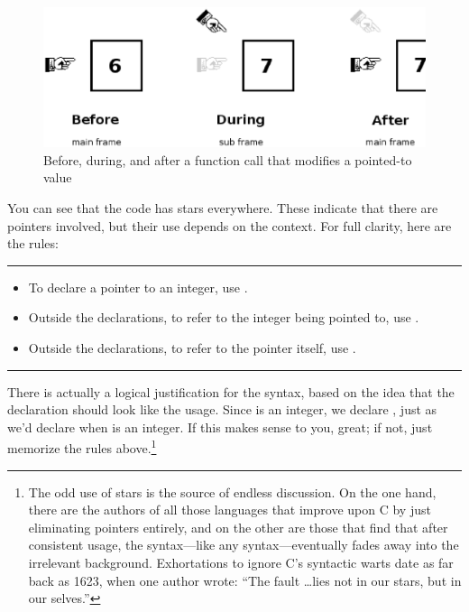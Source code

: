 \begin{figure}
\hskip -1cm
\includegraphics[width=\textwidth*\real{1.1}]{finger.ps}
\caption{Before, during, and after a function call that modifies a pointed-to value}
\label{fingerfig}
\end{figure}

\lstset{numbers=left, numberstyle=\scshape}
\lstset{numbers=none}

You can see that the code has stars everywhere. These
indicate that there are pointers involved, but their use depends on the
context.
For full clarity, here are the rules:
\vspace \baselineskip
\hrule
\vspace \baselineskip
\begin{itemize}
\item To declare a pointer to an integer, use .
\item Outside the declarations, to refer to the integer being pointed to, use .
\item Outside the declarations, to refer to the pointer itself, use
.
\end{itemize}
\vspace \baselineskip
\hrule
\vspace \baselineskip

There is actually a
logical justification for the syntax, based on the
idea that the declaration should look like
the usage. Since  is an integer, we declare ,
just as we'd declare  when  is an integer.
If this makes sense to you, great; if not, just memorize the rules 
above.\footnote{The
odd use of stars is the source of endless discussion. On the one hand,
there are the authors of all those languages that improve upon C by
just eliminating pointers entirely, and on the other are those that find
that after consistent usage, the syntax---like any syntax---eventually
fades away into the irrelevant background.  Exhortations to ignore
C's syntactic warts date as far back as 1623, when one author wrote:
``The fault \dots lies not in our stars, but in our
selves.''}

